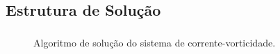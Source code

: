 \documentclass{beamer}
\begin{document}
\subsection{Estrutura de Solução}
\begin{frame}
  \frametitle{\subsecname}
  
  \begin{minipage}{.48\textwidth}
    \begin{figure}
       {\raggedleft \tiny Algoritmo de solução do sistema de corrente-vorticidade.}
    \end{figure}
  \end{minipage}
  \hfill
  \begin{minipage}{.48\textwidth}
    \begin{figure}
      \stackunder{
}
\end{figure}
\end{minipage}
\end{frame}
\end{document}
